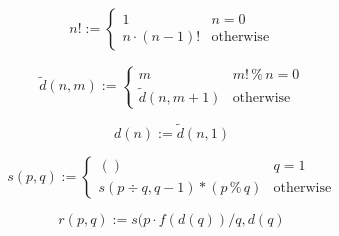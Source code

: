\documentclass[12pt]{article}
\begin{document}
\[
n! := 
\begin{cases}
1 & n = 0 \\ 
n \cdot (n-1)! & \textrm{otherwise} 
\end{cases}
\]

\[
{\tilde d} (n,m) := 
\begin{cases}
m & m! \operatorname{\%} n = 0 \\
{\tilde d} (n, m+1) & \textrm{otherwise} 
\end{cases}
\]

\[
d(n) := {\tilde d} (n,1)
\]

\[
s(p,q) := 
\begin{cases}
() & q = 1 \\
s (p \div q, q - 1) \ast (p \operatorname{\%} q) &
\mathrm{otherwise}
\end{cases}
\]

\[
r(p,q) := s (p \cdot f(d(q)) / q, d(q)
\]

\end{document}
